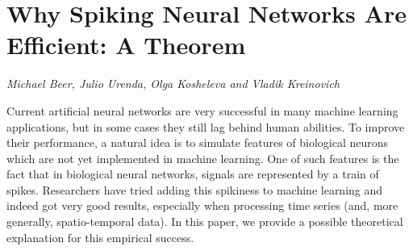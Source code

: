 \documentclass[../booklet.tex]{subfiles}
\begin{document}
\section[Why Spiking Neural Networks Are Efficient: A Theorem. {\it Michael Beer, Julio Urenda, Olga Kosheleva and Vladik Kreinovich}]{Why Spiking Neural Networks Are Efficient: A Theorem}
   

\begin{center}
  {\it Michael Beer, Julio Urenda, Olga Kosheleva and Vladik Kreinovich}
\end{center}

\vskip 0.8cm


Current artificial neural networks are very successful in many
machine learning applications, but in some cases they still lag
behind human abilities. To improve their performance, a natural
idea is to simulate features of biological neurons which are not
yet implemented in machine learning. One of such features is the
fact that in biological neural networks, signals are represented by
a train of spikes. Researchers have tried adding this spikiness to
machine learning and indeed got very good results, especially when
processing time series (and, more generally, spatio-temporal data).
In this paper, we provide a possible theoretical explanation for this
empirical success.

\end{document}
